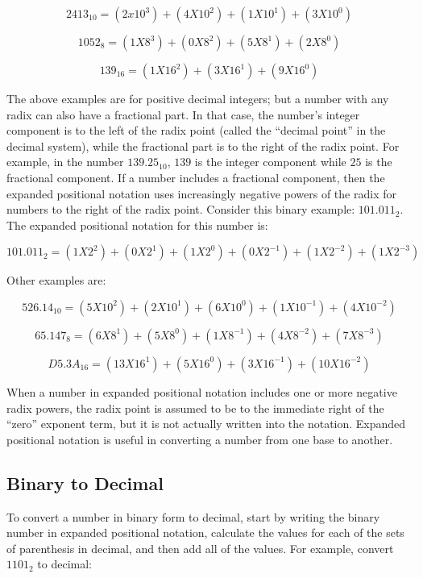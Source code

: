 \begin{equation}
2413_{10}=(2x10^3)+(4X10^2)+(1X10^1)+(3X10^0)
\end{equation} 

\begin{equation}
1052_8=(1X8^3)+(0X8^2)+(5X8^1)+(2X8^0)  
\end{equation}

\begin{equation}
139_{16}=(1X16^2)+(3X16^1)+(9X16^0)
\end{equation}

The above examples are for positive decimal integers; but a number with any radix can also have a fractional part. In that case, the number's integer component is to the left of the radix point (called the ``decimal point'' in the decimal system), while the fractional part is to the right of the radix point. For example, in the number $ 139.25_{10} $, $ 139 $ is the integer component while $ 25 $ is the fractional component. If a number includes a fractional component, then the expanded positional notation uses increasingly negative powers of the radix for numbers to the right of the radix point. Consider this binary example: $ 101.011_2 $. The expanded positional notation for this number is:

\begin{equation}
101.011_2=(1X2^2)+(0X2^1)+(1X2^0)+(0X2^{-1})+(1X2^{-2})+(1X2^{-3})
\end{equation}

Other examples are:

\begin{equation}
526.14_{10}=(5X10^2)+(2X10^1)+(6X10^0)+(1X10^{-1})+(4X10^{-2})
\end{equation}

\begin{equation}
65.147_8=(6X8^1)+(5X8^0)+(1X8^{-1})+(4X8^{-2})+(7X8^{-3})
\end{equation}

\begin{equation}
D5.3A_{16}=(13X16^1)+(5X16^0)+(3X16^{-1})+(10X16^{-2})
\end{equation}

When a number in expanded positional notation includes one or more negative radix powers, the radix point is assumed to be to the immediate right of the ``zero'' exponent term, but it is not actually written into the notation. Expanded positional notation is useful in converting a number from one base to another. 

\subsection{Binary to Decimal}
\label{MF:sub:binary_to_decimal}
To convert a number in binary form to decimal, start by writing the binary number in expanded positional notation, calculate the values for each of the sets of parenthesis in decimal, and then add all of the values. For example, convert $ 1101_2 $ to decimal:

